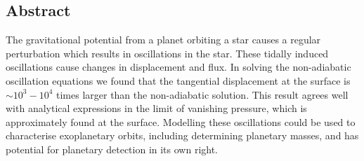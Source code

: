 \documentclass[a0,portrait]{a0poster}
\begin{document}
\vspace{0.5cm} %


\begin{multicols}{2} %


\color{black} %


\begin{tcolorbox}[colframe=black,colback=blue!10!white]

\vspace{0.5cm}

\section*{Abstract}
\Large
The gravitational potential from a planet orbiting a star causes a regular perturbation which results in oscillations in the star. These tidally induced oscillations cause changes in displacement and flux. In solving the non-adiabatic oscillation equations we found that the tangential displacement at the surface is $\sim 10^{3} - 10^{4}$ times larger than the non-adiabatic solution. This result agrees well with analytical expressions in the limit of vanishing pressure, which is approximately found at the surface. Modelling these oscillations could be used to characterise exoplanetary orbits, including determining planetary masses, and has potential for planetary detection in its own right.
\normalsize

\vspace{0.5cm}

\end{tcolorbox}


\color{Black} %

\begin{tcolorbox}[colframe=black,colback=blue!10!white]


\end{tcolorbox}
\end{multicols}
\end{document}
